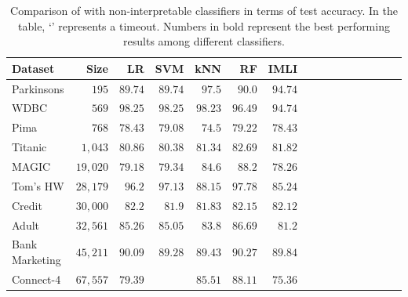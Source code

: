 \begin{table}     
	\centering
	\caption[Accuracy of {\imli} and non-interpretable classifiers]{Comparison of {\imli} with non-interpretable classifiers in terms of test accuracy. In the table, `\textemdash' represents a timeout. Numbers in bold represent the best performing results among different classifiers.}
	\label{interpretability_imli_table:non_interpretable_classifiers}
	\small
	\begin{tabular}{lrrrrrrrrrrrrrrr}
		
		
		
		
		\toprule
		Dataset & Size & LR & SVM & kNN & RF & IMLI \\
		
		\midrule
		\multirow{1}{*}{Parkinsons} & \multirow{1}{*}{ $ 195 $ }  &
		$ 89.74 $  &  $ 89.74 $  &  $ \mathbf{97.5} $  &  $ 90.0 $  &  $ 94.74 $  \\
		\multirow{1}{*}{WDBC} & \multirow{1}{*}{ $ 569 $ }  &
		$ \mathbf{98.25} $  &  $ \mathbf{98.25} $  &  $ 98.23 $  &  $ 96.49 $  &  $ 94.74 $  \\
		\multirow{1}{*}{Pima} & \multirow{1}{*}{ $ 768 $ }  &
		$ 78.43 $  &  $ 79.08 $  &  $ 74.5 $  &  $ \mathbf{79.22} $  &  $ 78.43 $  \\
		\multirow{1}{*}{Titanic} & \multirow{1}{*}{ $ 1,043 $ }  &
		$ 80.86 $  &  $ 80.38 $  &  $ 81.34 $  &  $ \mathbf{82.69} $  &  $ 81.82 $  \\
		\multirow{1}{*}{MAGIC} & \multirow{1}{*}{ $ 19,020 $ }  &
		$ 79.18 $  &  $ 79.34 $  &  $ 84.6 $  &  $ \mathbf{88.2} $  &  $ 78.26 $  \\
		\multirow{1}{*}{Tom's HW} & \multirow{1}{*}{ $ 28,179 $ }  &
		$ 96.2 $  &  $ 97.13 $  &  $ 88.15 $  &  $ \mathbf{97.78} $  &  $ 85.24 $  \\
		\multirow{1}{*}{Credit} & \multirow{1}{*}{ $ 30,000 $ }  &
		$ \mathbf{82.2} $  &  $ 81.9 $  &  $ 81.83 $  &  $ 82.15 $  &  $ 82.12 $  \\
		\multirow{1}{*}{Adult} & \multirow{1}{*}{ $ 32,561 $ }  &
		$ 85.26 $  &  $ 85.05 $  &  $ 83.8 $  &  $ \mathbf{86.69} $  &  $ 81.2 $  \\
		\multirow{1}{*}{Bank Marketing} & \multirow{1}{*}{ $ 45,211 $ }  &
		$ 90.09 $  &  $ 89.28 $  &  $ 89.43 $  &  $ \mathbf{90.27} $  &  $ 89.84 $  \\
		\multirow{1}{*}{Connect-4} & \multirow{1}{*}{ $ 67,557 $ }  &
		$ 79.39 $  & \textemdash &  $ 85.51 $  &  $ \mathbf{88.11} $  &  $ 75.36 $  \\

\end{tabular}
\end{table}

